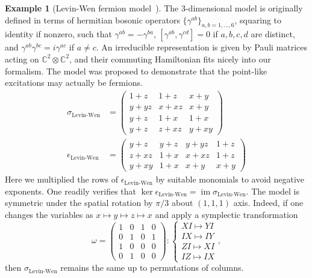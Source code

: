 \documentclass[letterpaper,12pt]{amsart}
\theoremstyle{definition} \newtheorem{defn}{Definition}
\theoremstyle{definition} \newtheorem{rem}{Remark}
\theoremstyle{definition} \newtheorem{example}{Example}
\newcommand{\im}{\mathop{\mathrm{im}}}
\begin{document}
\begin{example}[Levin-Wen fermion model~\cite{LevinWen2003Fermions}]
The 3-dimensional model is originally defined 
in terms of hermitian bosonic operators $\{ \gamma^{ab} \}_{a,b=1,\ldots,6}$,
squaring to identity if nonzero,
such that $\gamma^{ab}=-\gamma^{ba}$,
$[\gamma^{ab},\gamma^{cd}]=0$ if $a,b,c,d$ are distinct,
and
$\gamma^{ab}\gamma^{bc}=i\gamma^{ac}$ if $a \neq c$.
An irreducible representation is given by Pauli matrices acting on $\mathbb{C}^2 \otimes \mathbb{C}^2$,
and their commuting Hamiltonian fits nicely into our formalism.
The model was proposed to demonstrate that the point-like excitations may actually be fermions.
\begin{align*}
 \sigma_\text{Levin-Wen} &=
\begin{pmatrix}
 1+z & 1+z & x+y \\
 y+y z & x+x z & x+y \\
 y+z & 1+x & 1+x \\
 y+z & z+x z & y+x y
\end{pmatrix} \\
 \epsilon_\text{Levin-Wen} &=
\begin{pmatrix}
 y+z & y+z & y+y z & 1+z \\
 z+x z & 1+x & x+x z & 1+z \\
 y+x y & 1+x & x+y & x+y
\end{pmatrix}
\end{align*}
Here we multiplied the rows of $\epsilon_\text{Levin-Wen}$ by suitable monomials to avoid negative exponents.
One readily verifies that $\ker \epsilon_\text{Levin-Wen} = \im \sigma_\text{Levin-Wen}$.
The model is symmetric under the spatial rotation by $\pi/3$ about $(1,1,1)$ axis.
Indeed, if one changes the variables as $x \mapsto y \mapsto z \mapsto x$ and apply a symplectic transformation
\begin{equation}
 \omega = 
 \begin{pmatrix}
 1 & 0 & 1 & 0 \\
 0 & 1 & 0 & 1 \\
 1 & 0 & 0 & 0 \\
 0 & 1 & 0 & 0
 \end{pmatrix} :
 \begin{cases}
   XI \mapsto YI \\
   IX \mapsto IY \\
   ZI \mapsto XI \\
   IZ \mapsto IX
\end{cases} ,
\label{eq:symplectic-Levin-Wen}
\end{equation}
then $\sigma_\text{Levin-Wen}$ remains the same up to permutations of columns.



\end{example}
\end{document}
